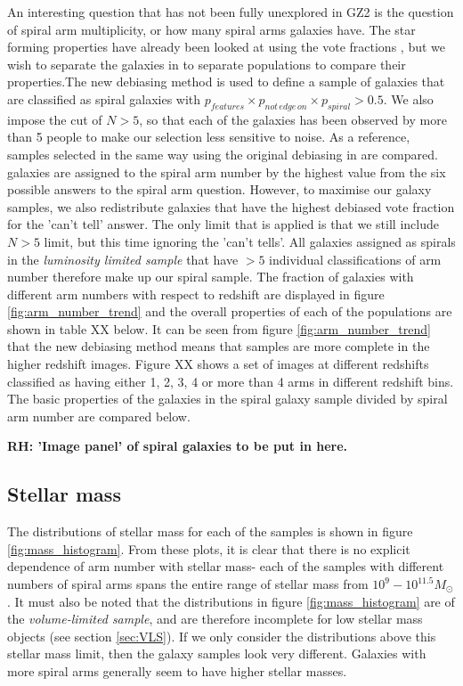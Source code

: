 \documentclass[useAMS,usenatbib]{mn2e}
\newcommand{\rh}[1]{{\bf \textcolor{RoyalPurple}{RH: #1}}}
\begin{document}
An interesting question that has not been fully unexplored in GZ2 is the question of spiral arm multiplicity, or how many spiral arms galaxies have. The star forming properties have already been looked at using the vote fractions \citep{Willett_15}, but we wish to separate the galaxies in to separate populations to compare their properties.The new debiasing method is used to define a sample of galaxies that are classified as spiral galaxies with $p_{features} \times p_{not \, edge \, on} \times p_{spiral} > 0.5$. We also impose the cut of $N>5$, so that each of the galaxies has been observed by more than 5 people to make our selection less sensitive to noise. As a reference, samples selected in the same way using the original debiasing in \citet{Willett_13} are compared. galaxies are assigned to the spiral arm number by the highest value from the six possible answers to the spiral arm question. However, to maximise our galaxy samples, we also redistribute galaxies that have the highest debiased vote fraction for the 'can't tell' answer. The only limit that is applied is that we still include $N>5$ limit, but this time ignoring the 'can't tells'. All galaxies assigned as spirals in the \textit{luminosity limited sample} that have $>5$ individual classifications of arm number therefore make up our spiral sample. The fraction of galaxies with different arm numbers with respect to redshift are displayed in figure \ref{fig:arm_number_trend} and the overall properties of each of the populations are shown in table XX below. It can be seen from figure \ref{fig:arm_number_trend} that the new debiasing method means that samples are more complete in the higher redshift images. Figure XX shows a set of images at different redshifts classified as having either 1, 2, 3, 4 or more than 4 arms in different redshift bins. The basic properties of the galaxies in the spiral galaxy sample divided by spiral arm number are compared below.

\rh{'Image panel' of spiral galaxies to be put in here.}

\subsection{Stellar mass}
\label{sec:mass}

The distributions of stellar mass for each of the samples is shown in figure \ref{fig:mass_histogram}. From these plots, it is clear that there is no explicit dependence of arm number with stellar mass- each of the samples with different numbers of spiral arms spans the entire range of stellar mass from $10^{9} - 10^{11.5} M_{\odot}$. It must also be noted that the distributions in figure \ref{fig:mass_histogram} are of the \textit{volume-limited sample}, and are therefore incomplete for low stellar mass objects (see section \ref{sec:VLS}). If we only consider the distributions above this stellar mass limit, then the galaxy samples look very different. Galaxies with more spiral arms generally seem to have higher stellar masses. 
\end{document}
